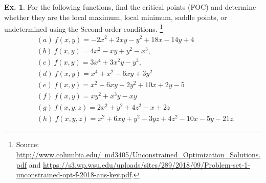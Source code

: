 \documentclass[10pt,a4paper]{book}
\theoremstyle{definition}\newtheorem{definition}{Definition}
\theoremstyle{definition}\newtheorem{fact}{Fact}
\theoremstyle{definition}\newtheorem{ex}{Ex.}
\theoremstyle{definition}\newtheorem{project}{Project}
\theoremstyle{definition}\newtheorem{problem}{Problem}
\theoremstyle{definition}\newtheorem{example}{Example}
\numberwithin{theorem}{chapter}
\numberwithin{corollary}{chapter}
\numberwithin{assumption}{chapter}
\numberwithin{definition}{chapter}
\numberwithin{prop}{chapter}
\numberwithin{notation}{chapter}
\numberwithin{problem}{chapter}
\numberwithin{example}{chapter}
\numberwithin{fact}{chapter}
\numberwithin{ex}{chapter}
\begin{document}
	\begin{ex} \label{exerciseSOC}
		For the following functions, find the critical points (FOC) and determine whether they are the local maximum, local minimum, saddle points, or undetermined using the Second-order conditions. \footnote{Source: \href{http://www.columbia.edu/~md3405/Unconstrained_Optimization_Solutions.pdf}{http://www.columbia.edu/~md3405/Unconstrained\_Optimization\_Solutions.pdf} and \href{https://s3.wp.wsu.edu/uploads/sites/289/2018/09/Problem-set-1-unconstrained-opt-f-2018-ans-key.pdf}{https://s3.wp.wsu.edu/uploads/sites/289/2018/09/Problem-set-1-unconstrained-opt-f-2018-ans-key.pdf}.}
		\begin{align*}
			& (a) \ f(x ,y) = -2x^2 + 2xy - y^2 + 18x - 14y + 4               \\
			& (b) \ f(x,y) = 4x^2 - xy + y^2 - x^3,                           \\
			& (c) \ f(x,y) = 3x^4 + 3x^2 y - y^3,                             \\
			& (d) \ f(x,y) = x^4 + x^2 - 6xy + 3y^2                           \\
			& (e) \ f(x,y) = x^2 - 6xy + 2y^2 + 10x + 2y - 5                  \\
			& (f) \ f(x,y) = xy^2 + x^3y - xy                                 \\
			& (g) \ f(x,y,z) = 2x^2 + y^2 + 4z^2 - x + 2z                     \\		
			& (h) \ f(x,y,z) = x^2 + 6xy + y^2 - 3yz + 4z^2 - 10x - 5y - 21z. 
		\end{align*}
	\end{ex}
	
\end{document}
